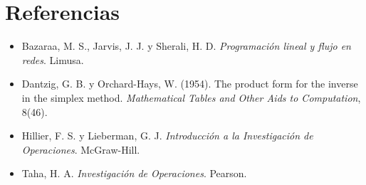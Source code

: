 \documentclass[11pt,a4paper]{article}
\begin{document}
\section*{Referencias}
\begin{itemize}[leftmargin=*, itemsep=3pt]
  \item Bazaraa, M. S., Jarvis, J. J. y Sherali, H. D. \textit{Programación lineal y flujo en redes}. Limusa.
  \item Dantzig, G. B. y Orchard-Hays, W. (1954). The product form for the inverse in the simplex method. \textit{Mathematical Tables and Other Aids to Computation}, 8(46).
  \item Hillier, F. S. y Lieberman, G. J. \textit{Introducción a la Investigación de Operaciones}. McGraw-Hill.
  \item Taha, H. A. \textit{Investigación de Operaciones}. Pearson.
\end{itemize}
\end{document}
